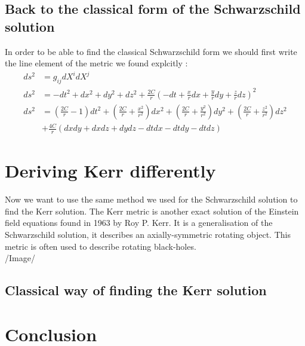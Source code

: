 \documentclass[a4paper,12pt]{article}
\begin{document}
\subsection{Back to the classical form of the Schwarzschild solution}
In order to be able to find the classical Schwarzschild form we should first write the line element of the metric we found explcitly :
\begin{align*}
	ds^2&=g_{ij}dX^idX^j\\
	ds^2&=-dt^2+dx^2+dy^2+dz^2+\frac{2C}{r}(-dt+\frac{x}{r}dx+\frac{y}{r}dy+\frac{z}{r}dz)^2\\
	ds^2&=(\frac{2C}{r}-1)dt^2+(\frac{2C}{r}+\frac{x^2}{r^2})dx^2+(\frac{2C}{r}+\frac{y^2}{r^2})dy^2+(\frac{2C}{r}+\frac{z^2}{r^2})dz^2\\
	&+\frac{4C}{r}(dxdy+dxdz+dydz-dtdx-dtdy-dtdz)
\end{align*}

\section{Deriving Kerr differently}
Now we want to use the same method we used for the Schwarzschild solution to find the Kerr solution.
The Kerr metric is another exact solution of the Einstein field equations found in 1963 by Roy P. Kerr.
It is a generalisation of the Schwarzschild solution, it describes an axially-symmetric rotating object.
This metric is often used to describe rotating black-holes.\\
/Image/
\subsection{Classical way of finding the Kerr solution}

\section{Conclusion}
\end{document}
